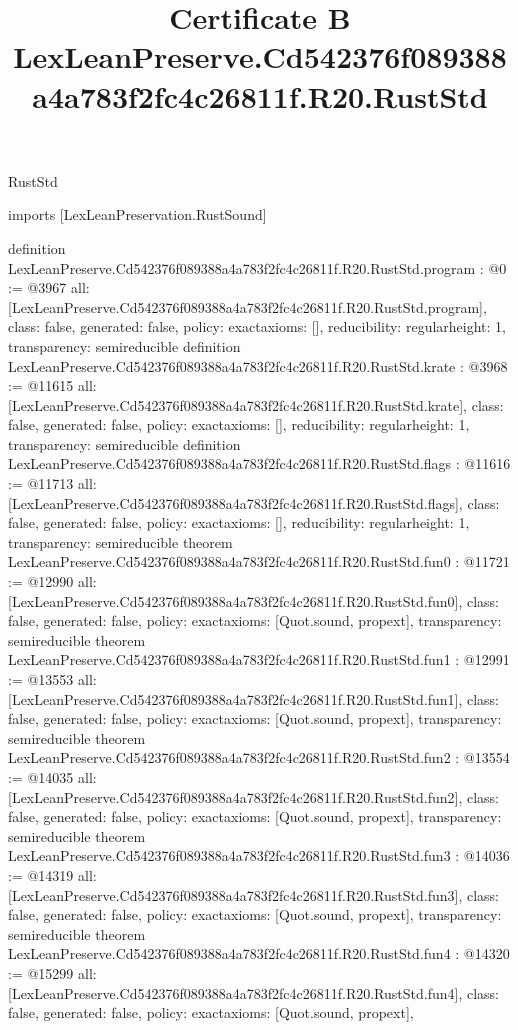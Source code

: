\begin{lexlean}{RustStd}
\title{Certificate B LexLeanPreserve.Cd542376f089388a4a783f2fc4c26811f.R20.RustStd}
\begin{coremodule}
imports [LexLeanPreservation.RustSound]

definition LexLeanPreserve.Cd542376f089388a4a783f2fc4c26811f.R20.RustStd.program : @0 := @3967 {
  all: [LexLeanPreserve.Cd542376f089388a4a783f2fc4c26811f.R20.RustStd.program],
  class: false,
  generated: false,
  policy: exact{axioms: []},
  reducibility: regular{height: 1},
  transparency: semireducible
}
definition LexLeanPreserve.Cd542376f089388a4a783f2fc4c26811f.R20.RustStd.krate : @3968 := @11615 {
  all: [LexLeanPreserve.Cd542376f089388a4a783f2fc4c26811f.R20.RustStd.krate],
  class: false,
  generated: false,
  policy: exact{axioms: []},
  reducibility: regular{height: 1},
  transparency: semireducible
}
definition LexLeanPreserve.Cd542376f089388a4a783f2fc4c26811f.R20.RustStd.flags : @11616 := @11713 {
  all: [LexLeanPreserve.Cd542376f089388a4a783f2fc4c26811f.R20.RustStd.flags],
  class: false,
  generated: false,
  policy: exact{axioms: []},
  reducibility: regular{height: 1},
  transparency: semireducible
}
theorem LexLeanPreserve.Cd542376f089388a4a783f2fc4c26811f.R20.RustStd.fun0 : @11721 := @12990 {
  all: [LexLeanPreserve.Cd542376f089388a4a783f2fc4c26811f.R20.RustStd.fun0],
  class: false,
  generated: false,
  policy: exact{axioms: [Quot.sound, propext]},
  transparency: semireducible
}
theorem LexLeanPreserve.Cd542376f089388a4a783f2fc4c26811f.R20.RustStd.fun1 : @12991 := @13553 {
  all: [LexLeanPreserve.Cd542376f089388a4a783f2fc4c26811f.R20.RustStd.fun1],
  class: false,
  generated: false,
  policy: exact{axioms: [Quot.sound, propext]},
  transparency: semireducible
}
theorem LexLeanPreserve.Cd542376f089388a4a783f2fc4c26811f.R20.RustStd.fun2 : @13554 := @14035 {
  all: [LexLeanPreserve.Cd542376f089388a4a783f2fc4c26811f.R20.RustStd.fun2],
  class: false,
  generated: false,
  policy: exact{axioms: [Quot.sound, propext]},
  transparency: semireducible
}
theorem LexLeanPreserve.Cd542376f089388a4a783f2fc4c26811f.R20.RustStd.fun3 : @14036 := @14319 {
  all: [LexLeanPreserve.Cd542376f089388a4a783f2fc4c26811f.R20.RustStd.fun3],
  class: false,
  generated: false,
  policy: exact{axioms: [Quot.sound, propext]},
  transparency: semireducible
}
theorem LexLeanPreserve.Cd542376f089388a4a783f2fc4c26811f.R20.RustStd.fun4 : @14320 := @15299 {
  all: [LexLeanPreserve.Cd542376f089388a4a783f2fc4c26811f.R20.RustStd.fun4],
  class: false,
  generated: false,
  policy: exact{axioms: [Quot.sound, propext]},
}
\end{coremodule}
\end{lexlean}

